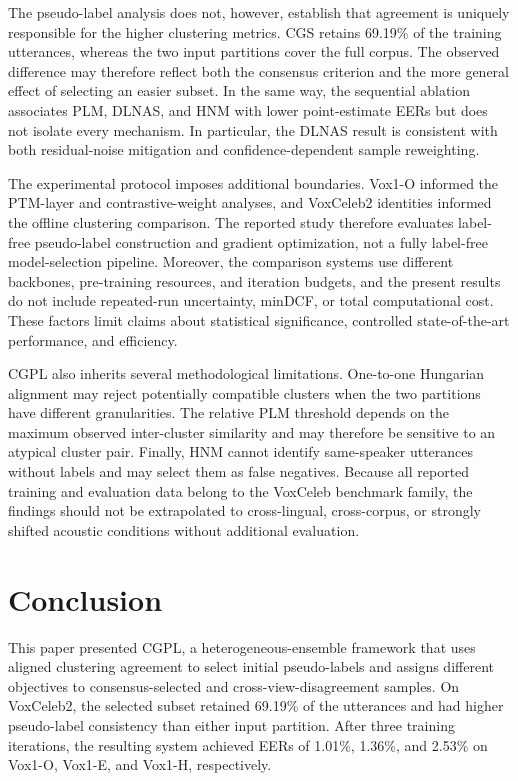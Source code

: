 \documentclass[journal]{IEEEtran}
\begin{document}
The pseudo-label analysis does not, however, establish that agreement is
uniquely responsible for the higher clustering metrics. CGS retains 69.19\%
of the training utterances, whereas the two input partitions cover the full
corpus. The observed difference may therefore reflect both the consensus
criterion and the more general effect of selecting an easier subset. In the
same way, the sequential ablation associates PLM, DLNAS, and HNM with lower
point-estimate EERs but does not isolate every mechanism. In particular, the
DLNAS result is consistent with both residual-noise mitigation and
confidence-dependent sample reweighting.

The experimental protocol imposes additional boundaries. Vox1-O informed
the PTM-layer and contrastive-weight analyses, and VoxCeleb2 identities
informed the offline clustering comparison. The reported study therefore
evaluates label-free pseudo-label construction and gradient optimization,
not a fully label-free model-selection pipeline. Moreover, the comparison
systems use different backbones, pre-training resources, and iteration
budgets, and the present results do not include repeated-run uncertainty,
minDCF, or total computational cost. These factors limit claims about
statistical significance, controlled state-of-the-art performance, and
efficiency.

CGPL also inherits several methodological limitations. One-to-one Hungarian
alignment may reject potentially compatible clusters when the two
partitions have different granularities. The relative PLM threshold depends
on the maximum observed inter-cluster similarity and may therefore be
sensitive to an atypical cluster pair. Finally, HNM cannot identify
same-speaker utterances without labels and may select them as false
negatives. Because all reported training and evaluation data belong to the
VoxCeleb benchmark family, the findings should not be extrapolated to
cross-lingual, cross-corpus, or strongly shifted acoustic conditions without
additional evaluation.

\section{Conclusion}

This paper presented CGPL, a heterogeneous-ensemble framework that uses
aligned clustering agreement to select initial pseudo-labels and assigns
different objectives to consensus-selected and cross-view-disagreement
samples. On VoxCeleb2, the selected subset retained 69.19\% of the
utterances and had higher pseudo-label consistency than either input
partition. After three training iterations, the resulting system achieved
EERs of 1.01\%, 1.36\%, and 2.53\% on Vox1-O, Vox1-E, and Vox1-H,
respectively.
\end{document}
